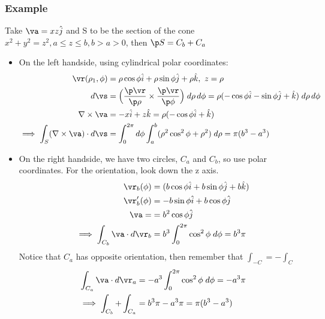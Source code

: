 \documentclass[a4paper, 11pt, normalem]{report}
\begin{document}
\subsection{Example}
Take $\va = xz\hat{j}$ and S to be the section of the cone $x^2 + y^2 = z^2, a \leq z \leq b, b > a > 0$, then $\p S = C_b + C_a$
\begin{itemize}
    \item On the left handside, using cylindrical polar coordinates:
            \begin{align*}
                \vr(\rho_1, \phi) &= \rho\cos\phi \hat{i} + \rho\sin\phi \hat{j} + \rho \hat{k},~ z = \rho \\
                d\vs &= \Big(\frac{\p \vr}{\p \rho} \times \frac{\p \vr}{\p \phi}\Big)\;d\rho\,d\phi = \rho(-\cos\phi \hat{i} - \sin\phi \hat{j} + \hat{k})\;d\rho\,d\phi \\
                \nabla \times \va &= -x\hat{i} + z\hat{k} = \rho(-\cos\phi \hat{i} + \hat{k}) \\
                \implies \int_S (\nabla \times \va)\cdot d\vs &= \int_0^{2\pi} d\phi \int_a^b  (\rho^2 \cos^2\phi + \rho^2)\;d\rho = \pi (b^3 - a^3)
            \end{align*}
    \item On the right handside, we have two circles, $C_a$ and $C_b$, so use polar coordinates. For the orientation, look down the z axis.
            \begin{align*}
                \vr_b(\phi) &= (b\cos\phi \hat{i} + b\sin\phi \hat{j} + b\hat{k}) \\
                \vr_b'(\phi) &= -b\sin\phi \hat{i} + b\cos\phi\hat{j} \\
                \va = &= b^2\cos\phi \hat{j} \\
                \implies \int_{C_b} \va \cdot d\vr_b &= b^3 \int_0^{2\pi} \cos^2\phi\;d\phi = b^3 \pi
            \end{align*}
            Notice that $C_a$ has opposite orientation, then remember that $\int_{-C} = -\int_C$
            \begin{align*}
                \int_{C_a} \va \cdot d\vr_a &= -a^3\int_0^{2\pi} \cos^2\phi\;d\phi = -a^3 \pi \\
                \implies \int_{C_b} + \int_{C_a} &= b^3 \pi - a^3 \pi = \pi(b^3 - a^3)
            \end{align*}
\end{itemize}

\chapter{}
\end{document}
